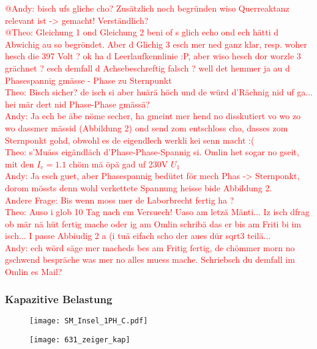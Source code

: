 \begin{flushleft}
\textcolor{red}{@Andy: bisch ufs gliche cho? Zusätzlich noch begründen wiso Querreaktanz relevant ist -> gemacht! Verständlich?\\
@Theo: Gleichung 1 ond Gleichung 2 beni of s glich echo ond  ech hätti d Abwichig au so begröndet. Aber d Glichig 3 esch mer ned ganz klar, resp. woher hesch die 397 Volt ? ok ha d Leerlaufkennlinie :P, aber wiso hesch dor worzle 3 grächnet ? esch demfall d Achsebeschreftig falsch ? well det hemmer ja au d Phasespannig gmässe - Phase zu Sternpunkt\\
Theo: Bisch sicher? de isch si aber huärä höch und de würd d'Rächnig nid uf ga... hei mär dert nid Phase-Phase gmässä?\\
Andy: Ja ech be äbe nöme secher, ha gmeint mer hend no disskutiert vo wo zo wo dassmer mässid (Abbildung 2) ond send zom entschloss cho, dasses zom Sternponkt gohd, obwohl es de eigendlech werkli kei senn macht :(\\
Theo: s'Muäss eigändläch d'Phase-Phase-Spannig si. Omlin het sogar no gseit, mit den $I_e =1.1$ chöm mä öpä gad uf 230V $U_1$\\
Andy: Ja esch guet, aber Phasespannig bedütet för mech Phas -> Sternponkt, dorom mössts denn wohl verkettete Spannung heisse bide Abbildung 2.\\
Andere Frage: Bis wenn moss mer de Laborbrecht fertig ha ?\\
Theo: Auso i glob 10 Tag nach em Versuech! Uaso am letzä Mänti... Iz isch dfrag ob mär nä hüt fertig mache oder ig am Omlin schribä das er bis am Friti bi im isch... I passe Abbiudig 2 a (i tuä eifach scho der aues dür sqrt{3} teilä...\\ Andy: ech wörd säge mer macheds bes am Fritig fertig, de chömmer morn no gschwend bespräche was mer no alles muess mache. Schriebsch du demfall im Omlin es Mail?}
\newpage




\subsubsection{Kapazitive Belastung}

\begin{figure}[H]
\begin{minipage}[t]{0.55\textwidth}
\centering
\texttt{[image: SM\_Insel\_1PH\_C.pdf]}
\label{fig:abb1}
\end{minipage}
\begin{minipage}[t]{0.4\textwidth}
\centering
\texttt{[image: 631\_zeiger\_kap]}
    \label{fig:abb1}
\end{minipage}
\end{figure}



\end{flushleft}
